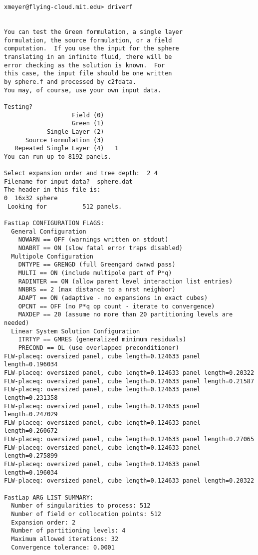 \begin{verbatim}
xmeyer@flying-cloud.mit.edu> driverf


You can test the Green formulation, a single layer
formulation, the source formulation, or a field
computation.  If you use the input for the sphere
translating in an infinite fluid, there will be
error checking as the solution is known.  For
this case, the input file should be one written
by sphere.f and processed by c2fdata.
You may, of course, use your own input data.

Testing? 
                   Field (0)
                   Green (1)
            Single Layer (2)
      Source Formulation (3)
   Repeated Single Layer (4)   1
You can run up to 8192 panels.

Select expansion order and tree depth:  2 4
Filename for input data?  sphere.dat
The header in this file is:
0  16x32 sphere                                                                 
 Looking for          512 panels.

FastLap CONFIGURATION FLAGS:
  General Configuration
    NOWARN == OFF (warnings written on stdout)
    NOABRT == ON (slow fatal error traps disabled)
  Multipole Configuration
    DNTYPE == GRENGD (full Greengard dwnwd pass)
    MULTI == ON (include multipole part of P*q)
    RADINTER == ON (allow parent level interaction list entries)
    NNBRS == 2 (max distance to a nrst neighbor)
    ADAPT == ON (adaptive - no expansions in exact cubes)
    OPCNT == OFF (no P*q op count - iterate to convergence)
    MAXDEP == 20 (assume no more than 20 partitioning levels are needed)
  Linear System Solution Configuration
    ITRTYP == GMRES (generalized minimum residuals)
    PRECOND == OL (use overlapped preconditioner)
FLW-placeq: oversized panel, cube length=0.124633 panel length=0.196034
FLW-placeq: oversized panel, cube length=0.124633 panel length=0.20322
FLW-placeq: oversized panel, cube length=0.124633 panel length=0.21587
FLW-placeq: oversized panel, cube length=0.124633 panel length=0.231358
FLW-placeq: oversized panel, cube length=0.124633 panel length=0.247029
FLW-placeq: oversized panel, cube length=0.124633 panel length=0.260672
FLW-placeq: oversized panel, cube length=0.124633 panel length=0.27065
FLW-placeq: oversized panel, cube length=0.124633 panel length=0.275899
FLW-placeq: oversized panel, cube length=0.124633 panel length=0.196034
FLW-placeq: oversized panel, cube length=0.124633 panel length=0.20322

FastLap ARG LIST SUMMARY:
  Number of singularities to process: 512
  Number of field or collocation points: 512
  Expansion order: 2
  Number of partitioning levels: 4
  Maximum allowed iterations: 32
  Convergence tolerance: 0.0001



\end{verbatim}
